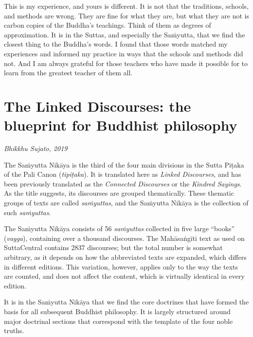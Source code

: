 \documentclass[12pt,openany]{book}%
\newcommand*{\scbyline}[1]{\begin{flushright}\textit{#1}\end{flushright}\bigskip}
\begin{document}
This is my experience, and yours is different. It is not that the traditions, schools, and methods are wrong. They are fine for what they are, but what they are not is carbon copies of the Buddha’s teachings. Think of them as degrees of approximation. It is in the Suttas, and especially the \textsanskrit{Saṁyutta}, that we find the closest thing to the Buddha’s words. I found that those words matched my experiences and informed my practice in ways that the schools and methods did not. And I am always grateful for those teachers who have made it possible for to learn from the greatest teacher of them all.

%
\chapter*{The Linked Discourses: the blueprint for Buddhist philosophy}

\scbyline{Bhikkhu Sujato, 2019}

The \textsanskrit{Saṁyutta} \textsanskrit{Nikāya} is the third of the four main divisions in the Sutta \textsanskrit{Piṭaka} of the Pali Canon (\textit{\textsanskrit{tipiṭaka}}). It is translated here as \textit{Linked Discourses}, and has been previously translated as the \textit{Connected Discourses} or the \textit{Kindred Sayings}. As the title suggests, its discourses are grouped thematically. These thematic groups of texts are called \textit{\textsanskrit{saṁyuttas}}, and the \textsanskrit{Saṁyutta} \textsanskrit{Nikāya} is the collection of such \textit{\textsanskrit{saṁyuttas}}.

The \textsanskrit{Saṁyutta} \textsanskrit{Nikāya} consists of 56 \textit{\textsanskrit{saṁyuttas}} collected in five large “books” (\textit{vagga}), containing over a thousand discourses. The \textsanskrit{Mahāsaṅgīti} text as used on SuttaCentral contains 2837 discourses; but the total number is somewhat arbitrary, as it depends on how the abbreviated texts are expanded, which differs in different editions. This variation, however, applies only to the way the texts are counted, and does not affect the content, which is virtually identical in every edition.

It is in the \textsanskrit{Saṁyutta} \textsanskrit{Nikāya} that we find the core doctrines that have formed the basis for all subsequent Buddhist philosophy. It is largely structured around major doctrinal sections that correspond with the template of the four noble truths.
\end{document}
